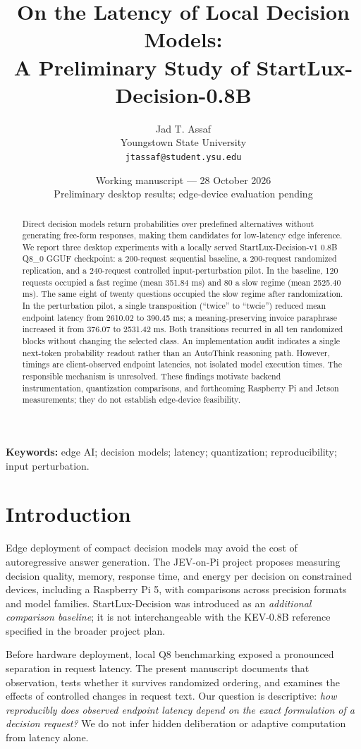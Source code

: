 \documentclass[10pt,twocolumn]{article}
\title{\bfseries On the Latency of Local Decision Models:\\A Preliminary Study of StartLux-Decision-0.8B}
\author{Jad T. Assaf\\Youngstown State University\\\texttt{jtassaf@student.ysu.edu}}
\date{Working manuscript --- 28 October 2026\\\small Preliminary desktop results; edge-device evaluation pending}
\begin{document}
\maketitle
\begin{abstract}
Direct decision models return probabilities over predefined alternatives without generating free-form responses, making them candidates for low-latency edge inference. We report three desktop experiments with a locally served StartLux-Decision-v1 0.8B Q8\_0 GGUF checkpoint: a 200-request sequential baseline, a 200-request randomized replication, and a 240-request controlled input-perturbation pilot. In the baseline, 120 requests occupied a fast regime (mean 351.84 ms) and 80 a slow regime (mean 2525.40 ms). The same eight of twenty questions occupied the slow regime after randomization. In the perturbation pilot, a single transposition (``twice'' to ``twcie'') reduced mean endpoint latency from 2610.02 to 390.45 ms; a meaning-preserving invoice paraphrase increased it from 376.07 to 2531.42 ms. Both transitions recurred in all ten randomized blocks without changing the selected class. An implementation audit indicates a single next-token probability readout rather than an AutoThink reasoning path. However, timings are client-observed endpoint latencies, not isolated model execution times. The responsible mechanism is unresolved. These findings motivate backend instrumentation, quantization comparisons, and forthcoming Raspberry Pi and Jetson measurements; they do not establish edge-device feasibility.
\end{abstract}
\noindent\textbf{Keywords:} edge AI; decision models; latency; quantization; reproducibility; input perturbation.

\section{Introduction}
Edge deployment of compact decision models may avoid the cost of autoregressive answer generation. The JEV-on-Pi project proposes measuring decision quality, memory, response time, and energy per decision on constrained devices, including a Raspberry Pi 5, with comparisons across precision formats and model families. StartLux-Decision was introduced as an \emph{additional comparison baseline}; it is not interchangeable with the KEV-0.8B reference specified in the broader project plan.

Before hardware deployment, local Q8 benchmarking exposed a pronounced separation in request latency. The present manuscript documents that observation, tests whether it survives randomized ordering, and examines the effects of controlled changes in request text. Our question is descriptive: \emph{how reproducibly does observed endpoint latency depend on the exact formulation of a decision request?} We do not infer hidden deliberation or adaptive computation from latency alone.
\end{document}
